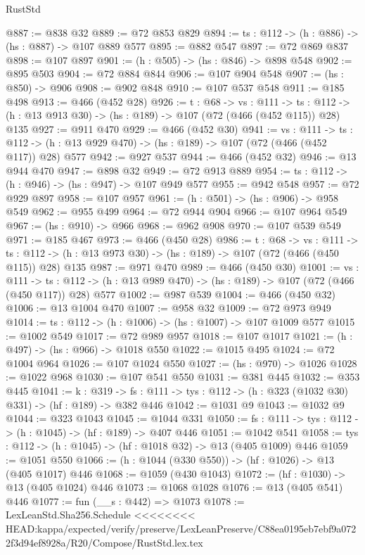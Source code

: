 \begin{lexlean}{RustStd}
\begin{coremodule}
{\begin{coremodule}
{{{{@887 := @838 @32
@889 := @72 @853 @829
@894 := {ts : @112} -> (h : @886) -> (hs : @887) -> @107 @889 @577
@895 := @882 @547
@897 := @72 @869 @837
@898 := @107 @897
@901 := (h : @505) -> (hs : @846) -> @898 @548
@902 := @895 @503
@904 := @72 @884 @844
@906 := @107 @904 @548
@907 := (hs : @850) -> @906
@908 := @902 @848
@910 := @107 @537 @548
@911 := @185 @498
@913 := @466 (@452 @28)
@926 := {t : @68} ->
  {vs : @111} ->
  {ts : @112} -> (h : @13 @913 @30) -> (hs : @189) -> @107 (@72 (@466 (@452 @115)) @28) @135
@927 := @911 @470
@929 := @466 (@452 @30)
@941 := {vs : @111} ->
  {ts : @112} -> (h : @13 @929 @470) -> (hs : @189) -> @107 (@72 (@466 (@452 @117)) @28) @577
@942 := @927 @537
@944 := @466 (@452 @32)
@946 := @13 @944 @470
@947 := @898 @32
@949 := @72 @913 @889
@954 := {ts : @112} -> (h : @946) -> (hs : @947) -> @107 @949 @577
@955 := @942 @548
@957 := @72 @929 @897
@958 := @107 @957
@961 := (h : @501) -> (hs : @906) -> @958 @549
@962 := @955 @499
@964 := @72 @944 @904
@966 := @107 @964 @549
@967 := (hs : @910) -> @966
@968 := @962 @908
@970 := @107 @539 @549
@971 := @185 @467
@973 := @466 (@450 @28)
@986 := {t : @68} ->
  {vs : @111} ->
  {ts : @112} -> (h : @13 @973 @30) -> (hs : @189) -> @107 (@72 (@466 (@450 @115)) @28) @135
@987 := @971 @470
@989 := @466 (@450 @30)
@1001 := {vs : @111} ->
  {ts : @112} -> (h : @13 @989 @470) -> (hs : @189) -> @107 (@72 (@466 (@450 @117)) @28) @577
@1002 := @987 @539
@1004 := @466 (@450 @32)
@1006 := @13 @1004 @470
@1007 := @958 @32
@1009 := @72 @973 @949
@1014 := {ts : @112} -> (h : @1006) -> (hs : @1007) -> @107 @1009 @577
@1015 := @1002 @549
@1017 := @72 @989 @957
@1018 := @107 @1017
@1021 := (h : @497) -> (hs : @966) -> @1018 @550
@1022 := @1015 @495
@1024 := @72 @1004 @964
@1026 := @107 @1024 @550
@1027 := (hs : @970) -> @1026
@1028 := @1022 @968
@1030 := @107 @541 @550
@1031 := @381 @445
@1032 := @353 @445
@1041 := {k : @319} ->
  {fs : @111} -> {tys : @112} -> (h : @323 (@1032 @30) @331) -> (hf : @189) -> @382 @446
@1042 := @1031 @9
@1043 := @1032 @9
@1044 := @323 @1043
@1045 := @1044 @331
@1050 := {fs : @111} -> {tys : @112} -> (h : @1045) -> (hf : @189) -> @407 @446
@1051 := @1042 @541
@1058 := {tys : @112} -> (h : @1045) -> (hf : @1018 @32) -> @13 (@405 @1009) @446
@1059 := @1051 @550
@1066 := (h : @1044 (@330 @550)) -> (hf : @1026) -> @13 (@405 @1017) @446
@1068 := @1059 (@430 @1043)
@1072 := (hf : @1030) -> @13 (@405 @1024) @446
@1073 := @1068 @1028
@1076 := @13 (@405 @541) @446
@1077 := fun (__s : @442) => @1073
@1078 := LexLeanStd.Sha256.Schedule
<<<<<<<< HEAD:kappa/expected/verify/preserve/LexLeanPreserve/C88ea0195eb7ebf9a0722f3d94ef8928a/R20/Compose/RustStd.lex.tex
}}}}
\end{coremodule}}
\end{coremodule}
\end{lexlean}
